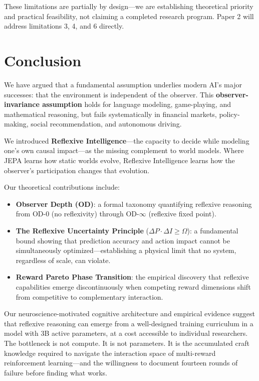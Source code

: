 \documentclass[11pt,a4paper]{article}
\begin{document}
These limitations are partially by design---we are establishing theoretical priority and practical feasibility, not claiming a completed research program. Paper 2 will address limitations 3, 4, and 6 directly.

\section{Conclusion}

We have argued that a fundamental assumption underlies modern AI's major successes: that the environment is independent of the observer. This \textbf{observer-invariance assumption} holds for language modeling, game-playing, and mathematical reasoning, but fails systematically in financial markets, policy-making, social recommendation, and autonomous driving.

We introduced \textbf{Reflexive Intelligence}---the capacity to decide while modeling one's own causal impact---as the missing complement to world models. Where JEPA learns how static worlds evolve, Reflexive Intelligence learns how the observer's participation changes that evolution.

Our theoretical contributions include:
\begin{itemize}[leftmargin=*]
\item \textbf{Observer Depth (OD)}: a formal taxonomy quantifying reflexive reasoning from OD-0 (no reflexivity) through OD-$\infty$ (reflexive fixed point).
\item \textbf{The Reflexive Uncertainty Principle} ($\Delta P \cdot \Delta I \geq \Omega$): a fundamental bound showing that prediction accuracy and action impact cannot be simultaneously optimized---establishing a physical limit that no system, regardless of scale, can violate.
\item \textbf{Reward Pareto Phase Transition}: the empirical discovery that reflexive capabilities emerge discontinuously when competing reward dimensions shift from competitive to complementary interaction.
\end{itemize}

Our neuroscience-motivated cognitive architecture and empirical evidence suggest that reflexive reasoning can emerge from a well-designed training curriculum in a model with 3B active parameters, at a cost accessible to individual researchers. The bottleneck is not compute. It is not parameters. It is the accumulated craft knowledge required to navigate the interaction space of multi-reward reinforcement learning---and the willingness to document fourteen rounds of failure before finding what works.
\end{document}
